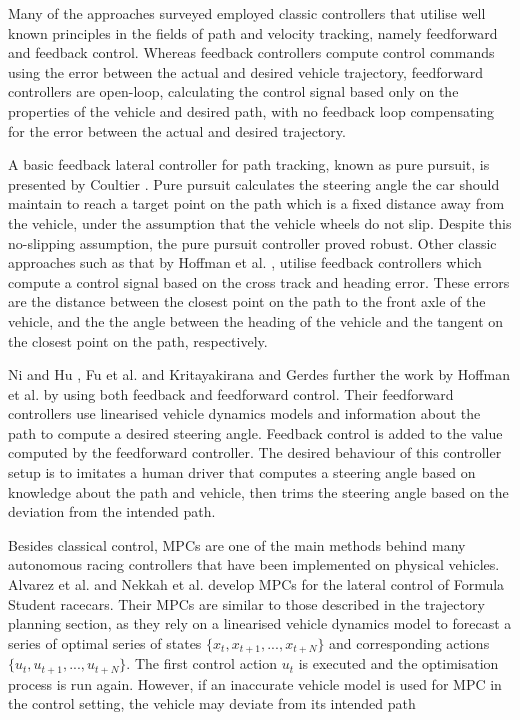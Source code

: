 Many of the approaches surveyed employed classic controllers that utilise well known principles in the fields of path and velocity tracking, namely feedforward and feedback control.
Whereas feedback controllers compute control commands using the error between the actual and desired vehicle trajectory, feedforward controllers are open-loop, calculating the control signal based only on the properties of the vehicle and desired path, with no feedback loop compensating for the error between the actual and desired trajectory.

A basic feedback lateral controller for path tracking, known as pure pursuit, is presented by Coultier \cite{Coulter_1992}. 
Pure pursuit calculates the steering angle the car should maintain to reach a target point on the path which is a fixed distance away from the vehicle, under the assumption that the vehicle wheels do not slip. 
Despite this no-slipping assumption, the pure pursuit controller proved robust.
Other classic approaches such as that by Hoffman et al. \cite{Hoffmann2007}, utilise feedback controllers which compute a control signal based on the cross track and heading error.
These errors are the distance between the closest point on the path to the front axle of the vehicle, and the the angle between the heading of the vehicle and the tangent on the closest point on the path, respectively.

Ni and Hu \cite{Ni2017}, Fu et al. \cite{Fu2016} and Kritayakirana and Gerdes \cite{Kritayakirana2012} further the work by Hoffman et al. \cite{Hoffmann2007} by using both feedback and feedforward control. 
Their feedforward controllers use linearised vehicle dynamics models and information about the path to compute a desired steering angle. Feedback control is added to the value computed by the feedforward controller.
The desired behaviour of this controller setup is to imitates a human driver that computes a steering angle based on knowledge about the path and vehicle, then trims the steering angle based on the deviation from the intended path.

Besides classical control, MPCs are one of the main methods behind many autonomous racing controllers that have been implemented on physical vehicles.
Alvarez et al. \cite{alvarez2022} and Nekkah et al. \cite{Nekkah2020} develop MPCs for the lateral control of Formula Student racecars.
Their MPCs  are similar to those described in the trajectory planning section, as they rely on a linearised vehicle dynamics model to forecast a series of optimal series of states $\{ x_t, x_{t+1}, ..., x_{t+N}\}$ and corresponding actions $\{ u_t, u_{t+1}, ..., u_{t+N}\}$. 
The first control action $u_{t}$ is executed and the optimisation process is run again.
However, if an inaccurate vehicle model is used for MPC in the control setting, the vehicle may deviate from its intended path

